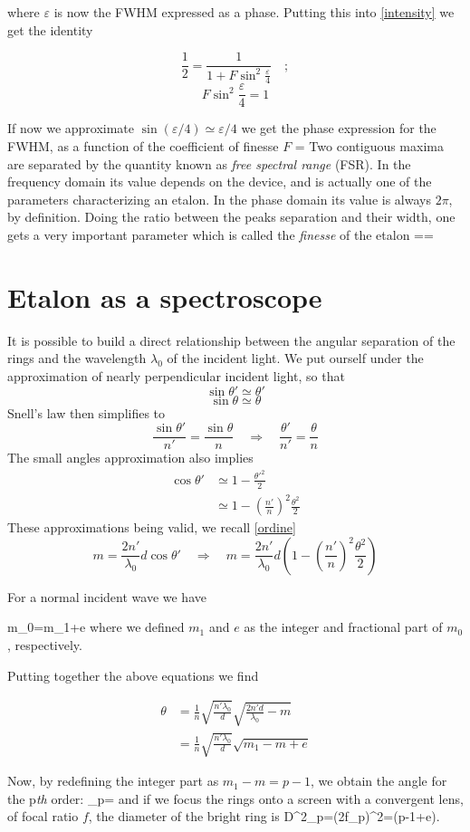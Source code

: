 where $\varepsilon$ is now the FWHM expressed as a phase. Putting this into \cref{intensity} we get the identity

$$\frac{1}{2}=\frac{1}{1+F\sin^2\frac{\varepsilon}{4}}\quad;$$ $$F\sin^2\frac{\varepsilon}{4}=1$$

If now we approximate $\sin\left(\varepsilon/4\right)\simeq\varepsilon/4$ we get the phase expression for the FWHM, as a function of the coefficient of finesse $F$
\mate
\varepsilon=
\atem
Two contiguous maxima are separated by the quantity known as \textit{free spectral range} (FSR). In the frequency domain its value depends on the device, and is actually one of the parameters characterizing an etalon. In the phase domain its value is always $2\pi$, by definition. Doing the ratio between the peaks separation and their width, one gets a very important parameter which is called the \textit{finesse} of the etalon
\mate
{}\equiv\frac{2\pi}{\varepsilon}==
\label{finesse}
\atem
	\section{Etalon as a spectroscope}\label{etalonspec}
It is possible to build a direct relationship between the angular separation of the rings and the wavelength $\lambda_0$ of the incident light.
We put ourself under the approximation of nearly perpendicular incident light, so that
$$\sin\theta'\simeq\theta'$$$$\sin\theta\simeq\theta$$
Snell's law then simplifies to
$$\frac{\sin\theta'}{n'}=\frac{\sin\theta}{n}\quad\Rightarrow\quad\frac{\theta'}{n'}=\frac{\theta}{n}$$
The small angles approximation also implies
\begin{align} 
\cos\theta'&\simeq1-\frac{\theta'^2}{2}\nonumber\\
&\simeq1-\left(\frac{n'}{n}\right)^2\frac{\theta^2}{2}\nonumber
\end{align}
These approximations being valid, we recall \cref{ordine}
$$m=\frac{2n'}{\lambda_0}d\cos\theta'\quad\Rightarrow\quad m=\frac{2n'}{\lambda_0}d\left(1-\left(\frac{n'}{n}\right)^2\frac{\theta^2}{2}\right)$$

For a normal incident wave we have

\mate
m_0=\equiv m_1+e
\atem
where we defined $m_1$ and $e$ as the integer and fractional part of $m_0$, respectively.

Putting together the above equations we find 

\begin{align}
\theta&=\frac{1}{n}\sqrt{\frac{n'\lambda_0}{d}}\sqrt{\frac{2n'd}{\lambda_0}-m}\nonumber\\
&=\frac{1}{n}\sqrt{\frac{n'\lambda_0}{d}}\sqrt{m_1-m+e}
\end{align}

Now, by redefining the integer part as $m_1-m=p-1$, we obtain the angle for the p\textit{th} order:
\mate
\theta_p=
\atem
and if we focus the rings onto a screen with a convergent lens, of focal ratio $f$, the diameter of the bright ring is
\mate
D^2_p=(2f\theta_p)^2=(p-1+e).
\atem